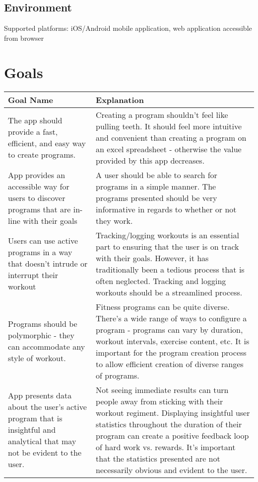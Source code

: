 \documentclass{article}
\begin{document}
\subsection{Environment}
Supported platforms: iOS/Android mobile application, web application accessible from browser


\section{Goals}

\begin{tabular}{ |p{5cm}|p{8cm}| }
	\hline
	Goal Name & Explanation \\
	\hline
	The app should provide a fast, efficient, and easy way to create programs. & Creating a program shouldn't feel like pulling teeth. It should feel more intuitive and convenient than creating a program on an excel spreadsheet - otherwise the value provided by this app decreases.  \\
	\hline
	App provides an accessible way for users to discover programs that are in-line with their goals & A user should be able to search for programs in a simple manner. The programs presented should be very informative in regards to whether or not they work. \\
	\hline
	Users can use active programs in a way that doesn't intrude or interrupt their workout & Tracking/logging workouts is an essential part to ensuring that the user is on track with their goals. However, it has traditionally been a tedious process that is often neglected. Tracking and logging workouts should be a streamlined process. \\
	\hline
	Programs should be polymorphic - they can accommodate any style of workout. & Fitness programs can be quite diverse. There’s a wide range of ways to configure a program - programs can vary by duration, workout intervals, exercise content, etc. It is important for the program creation process to allow efficient creation of diverse ranges of programs. \\
  \hline
	App presents data about the user's active program that is insightful and analytical that may not be evident to the user. & Not seeing immediate results can turn people away from sticking with their workout regiment. Displaying insightful user statistics throughout the duration of their program can create a positive feedback loop of hard work vs. rewards. It's important that the statistics presented are not necessarily obvious and evident to the user.   \\
	\hline
\end{tabular}
\end{document}
